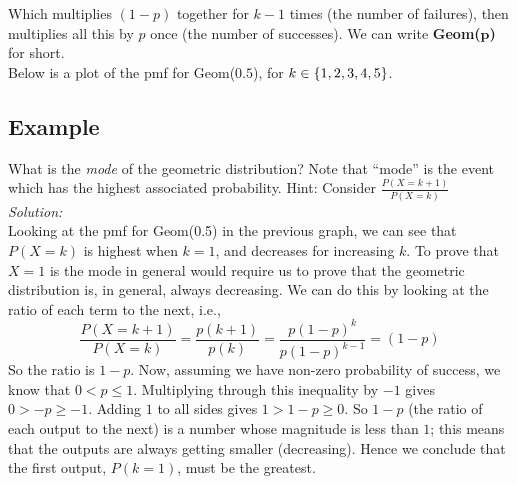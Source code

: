 \noindent Which multiplies $(1-p)$ together for $k-1$ times (the number of failures), then multiplies all this by $p$ once (the number of successes). We can write \textbf{Geom($\boldsymbol{p}$)} for short. \\

\noindent Below is a plot of the pmf for Geom($0.5$), for $k \in \left\{1,2,3,4,5\right\}$.
\begin{center}
\end{center}

\subsection{Example} \label{mode1(notreally)}
What is the \textit{mode} of the geometric distribution? Note that ``mode'' is the event which has the highest associated probability. Hint: Consider $\frac{P(X=k+1)}{P(X=k)}$ \\

\noindent \textit{Solution:} \\
Looking at the pmf for Geom(0.5) in the previous graph, we can see that $P(X = k)$ is highest when $k = 1$, and decreases for increasing $k$. To prove that $X = 1$ is the mode in general would require us to prove that the geometric distribution is, in general, always decreasing. We can do this by looking at the ratio of each term to the next, i.e.,
\[
\frac{P(X=k+1)}{P(X=k)} = \frac{p(k+1)}{p(k)} = \frac{p(1-p)^k}{p(1-p)^{k-1}} = (1-p) \tag{index laws}
\] 
So the ratio is $1-p$. Now, assuming we have non-zero probability of success, we know that $0 < p \leq 1$. Multiplying through this inequality by $-1$ gives $0 > -p \geq -1$. Adding $1$ to all sides gives $1 >1 - p \geq 0$. So $1-p$ (the ratio of each output to the next) is a number whose magnitude is less than $1$; this means that the outputs are always getting smaller (decreasing). Hence we conclude that the first output, $P(k = 1)$, must be the greatest.


